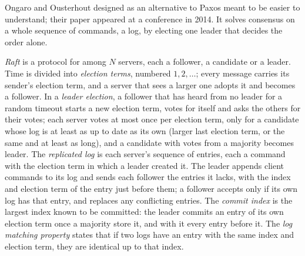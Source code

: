 Ongaro and Ousterhout designed  as an alternative to Paxos meant to be easier to understand; their paper appeared at a conference in 2014. %
It solves consensus on a whole sequence of commands, a log, by electing one leader that decides the order alone.

\begin{definition}\label{def:b3:replication-and-consensus:raft}
\emph{Raft} is a protocol for  among $N$ servers, each a follower, a candidate or a leader. Time is divided into \emph{election terms}, numbered $1, 2, \ldots$; every message carries its sender's election term, and a server that sees a larger one adopts it and becomes a follower. In a \emph{leader election}, a follower that has heard from no leader for a random timeout starts a new election term, votes for itself and asks the others for their votes; each server votes at most once per election term, only for a candidate whose log is at least as up to date as its own (larger last election term, or the same and at least as long), and a candidate with votes from a majority becomes leader. The \emph{replicated log} is each server's sequence of entries, each a command with the election term in which a leader created it. The leader appends client commands to its log and sends each follower the entries it lacks, with the index and election term of the entry just before them; a follower accepts only if its own log has that entry, and replaces any conflicting entries. The \emph{commit index} is the largest index known to be committed: the leader commits an entry of its own election term once a majority store it, and with it every entry before it. The \emph{log matching property} states that if two logs have an entry with the same index and election term, they are identical up to that index.
\end{definition}

